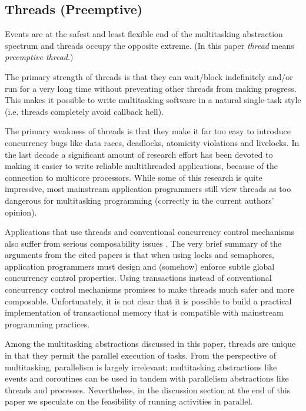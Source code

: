\documentclass[10pt,preprint]{sigplanconf}
\begin{document}
\subsection{Threads (Preemptive)}

Events are at the safest and least flexible end of the multitasking abstraction spectrum and threads occupy the opposite extreme.
(In this paper \emph{thread} means \emph{preemptive thread}.)

The primary strength of threads is that they can wait/block indefinitely and/or run for a very long time without preventing other threads from making progress.
This makes it possible to write multitasking software in a natural single-task style (i.e. threads completely avoid callback hell).

The primary weakness of threads is that they make it far too easy to introduce concurrency bugs like data races, deadlocks, atomicity violations and livelocks.
In the last decade a significant amount of research effort has been devoted to making it easier to write reliable multithreaded applications, because of the connection to multicore processors.
While some of this research is quite impressive, most mainstream application programmers still view threads as too dangerous for multitasking programming (correctly in the current authors' opinion).

Applications that use threads and conventional concurrency control mechanisms also suffer from serious composability issues \cite{Harris2005, Grossman2007}.
The very brief summary of the arguments from the cited papers is that when using locks and semaphores, application programmers must design and (somehow) enforce subtle global concurrency control properties.
Using transactions instead of conventional concurrency control mechanisms promises to make threads much safer and more composable.
Unfortunately, it is not clear that it is possible to build a practical implementation of transactional memory that is compatible with mainstream programming practices.

Among the multitasking abstractions discussed in this paper, threads are unique in that they permit the parallel execution of tasks.
From the perspective of multitasking, parallelism is largely irrelevant; multitasking abstractions like events and coroutines can be used in tandem with parallelism abstractions like threads and processes.
Nevertheless, in the discussion section at the end of this paper we speculate on the feasibility of running activities in parallel.
\end{document}
